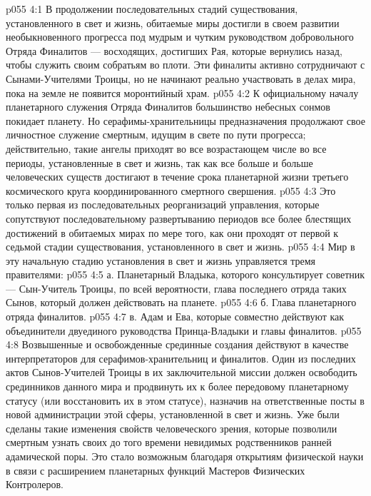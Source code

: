 \vs p055 4:1 В продолжении последовательных стадий существования, установленного в свет и жизнь, обитаемые миры достигли в своем развитии необыкновенного прогресса под мудрым и чутким руководством добровольного Отряда Финалитов --- восходящих, достигших Рая, которые вернулись назад, чтобы служить своим собратьям во плоти. Эти финалиты активно сотрудничают с Сынами\hyp{}Учителями Троицы, но не начинают реально участвовать в делах мира, пока на земле не появится моронтийный храм.
\vs p055 4:2 К официальному началу планетарного служения Отряда Финалитов большинство небесных сонмов покидает планету. Но серафимы\hyp{}хранительницы предназначения продолжают свое личностное служение смертным, идущим в свете по пути прогресса; действительно, такие ангелы приходят во все возрастающем числе во все периоды, установленные в свет и жизнь, так как все больше и больше человеческих существ достигают в течение срока планетарной жизни третьего космического круга координированного смертного свершения.
\vs p055 4:3 Это только первая из последовательных реорганизаций управления, которые сопутствуют последовательному развертыванию периодов все более блестящих достижений в обитаемых мирах по мере того, как они проходят от первой к седьмой стадии существования, установленного в свет и жизнь.
\vs p055 4:4 \bibnobreakspace {} Мир в эту начальную стадию установления в свет и жизнь управляется тремя правителями:
\vs p055 4:5 а. Планетарный Владыка, которого консультирует советник --- Сын\hyp{}Учитель Троицы, по всей вероятности, глава последнего отряда таких Сынов, который должен действовать на планете.
\vs p055 4:6 б. Глава планетарного отряда финалитов.
\vs p055 4:7 в. Адам и Ева, которые совместно действуют как объединители двуединого руководства Принца\hyp{}Владыки и главы финалитов.
\vs p055 4:8 \pc Возвышенные и освобожденные срединные создания действуют в качестве интерпретаторов для серафимов\hyp{}хранительниц и финалитов. Один из последних актов Сынов\hyp{}Учителей Троицы в их заключительной миссии должен освободить срединников данного мира и продвинуть их к более передовому планетарному статусу (или восстановить их в этом статусе), назначив на ответственные посты в новой администрации этой сферы, установленной в свет и жизнь. Уже были сделаны такие изменения свойств человеческого зрения, которые позволили смертным узнать своих до того времени невидимых родственников ранней адамической поры. Это стало возможным благодаря открытиям физической науки в связи с расширением планетарных функций Мастеров Физических Контролеров.
